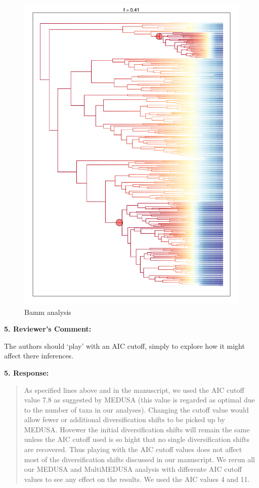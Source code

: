 \documentclass[]{article}
\begin{document}
\begin{figure}[htbp]
\centering
\includegraphics{response_to_reviewers_fig1.pdf}
\caption{Bamm analysis}
\end{figure}

\textbf{5. Reviewer's Comment:}

The authors should `play' with an AIC cutoff, simply to explore how it
might affect there inferences.

\textbf{5. Response:}

\begin{quote}
\color{blue}
As specified lines above and in the manuscript, we used the AIC cutoff
value 7.8 as suggested by MEDUSA (this value is regarded as optimal due
to the number of taxa in our analyses). Changing the cutoff value would
allow fewer or additional diversification shifts to be picked up by
MEDUSA. Hovewer the initial diversification shifts will remain the same
unless the AIC cutoff used is so hight that no single diversification
shifts are recovered. Thus playing with the AIC cutoff values does not
affect most of the diversification shifts discussed in our manuscript.
We rerun all our MEDUSA and MultiMEDUSA analysis with differente AIC
cutoff values to see any effect on the results. We used the AIC values 4
and 11.
\end{quote}
\end{document}

